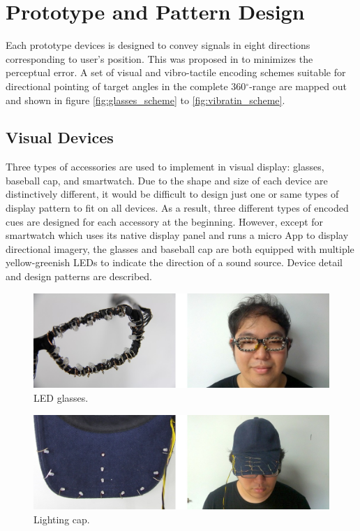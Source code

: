 \documentclass{sigchi}
\begin{document}
\section{Prototype and Pattern Design}

Each prototype devices is designed to convey signals in eight directions corresponding to user's position. This was proposed in \cite{Tessendorf2011} to minimizes the perceptual error. A set of visual and vibro-tactile encoding schemes suitable for directional pointing of target angles in the complete 360$^\circ$-range are mapped out and shown in figure \ref{fig:glasses_scheme} to \ref{fig:vibratin_scheme}.

\subsection{Visual Devices}
Three types of accessories are used to implement in visual display: glasses, baseball cap, and smartwatch. Due to the shape and size of each device are distinctively different, it would be difficult to design just one or same types of display pattern to fit on all devices. As a result, three different types of encoded cues are designed for each accessory at the beginning. However, except for smartwatch which uses its native display panel and runs a micro App to display directional imagery, the glasses and baseball cap are both equipped with multiple yellow-greenish LEDs to indicate the direction of a sound source. Device detail and design patterns are described.

\begin{figure}[!b]
\centering
\includegraphics[width=0.9\columnwidth]{glasses_4}
\caption{LED glasses.}
\label{fig:glasses}
\end{figure}

\begin{figure}[!b]
\centering
\includegraphics[width=0.9\columnwidth]{cap_4}
\caption{Lighting cap.}
\label{fig:cap}
\end{figure}
\end{document}
